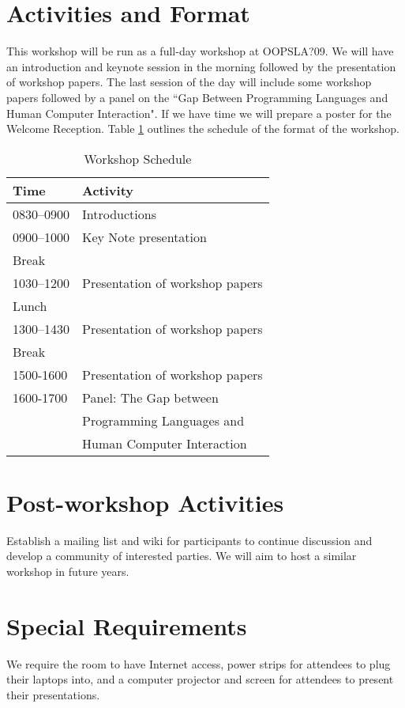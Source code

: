 \documentclass{acm_proc_article-sp}
\begin{document}
\section{Activities and Format}

This workshop will be run as a full-day workshop at OOPSLA?09. We will have an introduction and keynote session in the morning followed by the presentation of workshop papers. The last session of the day will include some workshop papers followed by a panel on the ``Gap Between Programming Languages and Human Computer Interaction". If we have time we will prepare a poster for the Welcome Reception. Table \ref{tab:schedule} outlines the schedule of the format of the workshop.


\begin{table} [!htbp] %
\caption{Workshop Schedule}
\begin{tabular}{|l|l|}
\hline \textbf{Time}   & \textbf{Activity}\\
\hline 0830--0900    & Introductions\\
\hline 0900--1000    & Key Note presentation\\
\hline Break              & \\
\hline 1030--1200   & Presentation of workshop papers\\
\hline Lunch             & \\
\hline 1300--1430   & Presentation of workshop papers\\
\hline Break              & \\
\hline 1500-1600    & Presentation of workshop papers\\
\hline 1600-1700    & Panel: The Gap between\\
                                   & Programming Languages and\\
                                    & Human Computer Interaction\\
\hline
\end{tabular}
\label{tab:schedule}
\end{table}

\section{Post-workshop Activities}

Establish a mailing list and wiki for participants to continue discussion and develop a community of 
interested parties. We will aim to host a similar workshop in future years.

\section{Special Requirements}

We require the room to have Internet access, power strips for attendees to plug their laptops into, and a computer projector and screen for attendees to present their presentations.


 
\end{document}
